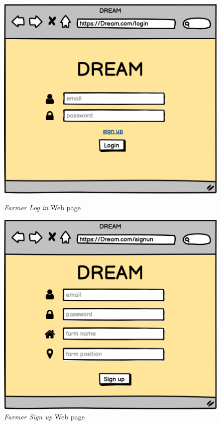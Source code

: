 \begin{figure}[ht!]
    \begin{minipage}{0.5\textwidth}
        \centering
        \includegraphics[width=1\textwidth]{mockups/FLogIn.png}
        \caption{\emph{Farmer Log in} Web page}
        \label{fig:mockupLogin}
    \end{minipage}\hfill
    \begin{minipage}{0.5\textwidth}
        \centering
        \includegraphics[width=1\textwidth]{mockups/SignUp.png}
        \caption{\emph{Farmer Sign up} Web page}
        \label{fig:smockupSignUp}
    \end{minipage}
\end{figure}

